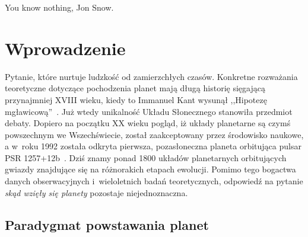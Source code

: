 \begin{savequote}[75mm]
   You know nothing, Jon Snow.
\end{savequote}

\chapter{Wprowadzenie}
 Pytanie, które nurtuje ludzkość od
zamierzchłych czasów. Konkretne rozważania teoretyczne dotyczące pochodzenia
planet mają długą historię sięgającą przynajmniej XVIII wieku, kiedy to Immanuel
Kant wysunął ,,Hipotezę mgławicową''~\cite{ImmanuelKant.etal:2008}. Już wtedy
unikalność Układu Słonecznego stanowiła przedmiot debaty. Dopiero na początku XX
wieku pogląd, iż układy planetarne są czymś powszechnym we Wszechświecie, został
zaakceptowany przez środowisko naukowe, a w~roku 1992 została odkryta pierwsza,
pozasłoneczna planeta orbitująca pulsar PSR 1257+12b~\cite{1992Natur.355..145W}.
Dziś znamy ponad 1800 układów planetarnych orbitujących gwiazdy znajdujące się
na różnorakich etapach ewolucji. Pomimo tego bogactwa danych obserwacyjnych
i~wieloletnich badań teoretycznych, odpowiedź na pytanie \emph{skąd wzięły się
planety} pozostaje niejednoznaczna.


\section{Paradygmat powstawania planet}
\label{sec:paradigm}
